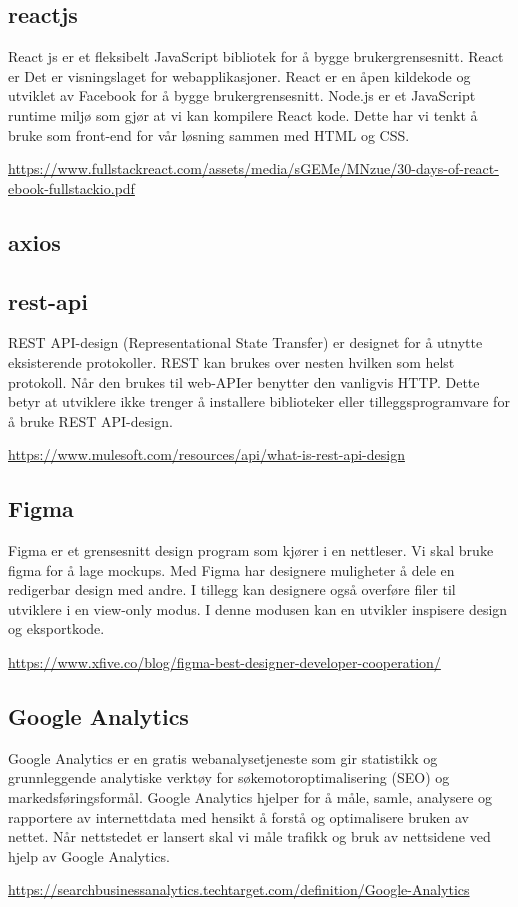 \subsection{reactjs}
React js er et fleksibelt JavaScript bibliotek for å bygge brukergrensesnitt. React er Det er visningslaget for webapplikasjoner. React er en åpen kildekode og utviklet av Facebook for å bygge brukergrensesnitt. Node.js er et JavaScript runtime miljø som gjør at vi kan kompilere React kode.
Dette har vi tenkt å bruke som front-end for vår løsning sammen med HTML og CSS. 

\url{https://www.fullstackreact.com/assets/media/sGEMe/MNzue/30-days-of-react-ebook-fullstackio.pdf}

\subsection{axios}
\subsection{rest-api}
REST API-design (Representational State Transfer) er designet for å utnytte eksisterende protokoller. REST kan brukes over nesten hvilken som helst protokoll. Når den brukes til web-APIer benytter den vanligvis HTTP. Dette betyr at utviklere ikke trenger å installere biblioteker eller tilleggsprogramvare for å bruke REST API-design.

\url{https://www.mulesoft.com/resources/api/what-is-rest-api-design}

\subsection{Figma}
Figma er et grensesnitt design program som kjører i en nettleser. Vi skal bruke figma for å lage mockups. Med Figma har designere muligheter å dele en redigerbar design med andre. I tillegg kan designere også overføre filer til utviklere i en view-only modus. I denne modusen kan en utvikler inspisere design og eksportkode.

\url{https://www.xfive.co/blog/figma-best-designer-developer-cooperation/}

\subsection{ Google Analytics}
Google Analytics er en gratis webanalysetjeneste som gir statistikk og grunnleggende analytiske verktøy for søkemotoroptimalisering (SEO) og markedsføringsformål. Google Analytics hjelper for å måle, samle, analysere og rapportere av internettdata med hensikt å forstå og optimalisere bruken av nettet.
Når nettstedet er lansert skal vi måle trafikk og bruk av nettsidene ved hjelp av Google Analytics.

\url{https://searchbusinessanalytics.techtarget.com/definition/Google-Analytics}

\clearpage